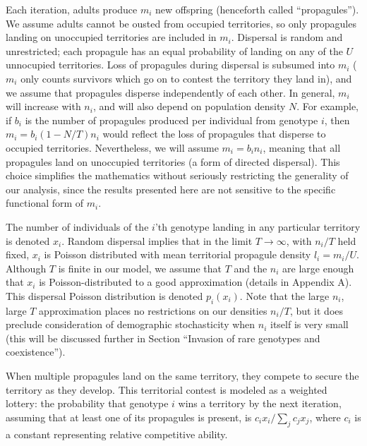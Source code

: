 \documentclass[11pt]{article}
\begin{document}
Each iteration, adults produce $m_i$ new offspring (henceforth called ``propagules''). We assume adults cannot be ousted from occupied territories, so only propagules landing on unoccupied territories are included in $m_i$. Dispersal is random and unrestricted; each propagule has an equal probability of landing on any of the $U$ unnocupied territories. Loss of propagules during dispersal is subsumed into $m_i$ ($m_i$ only counts survivors which go on to contest the territory they land in), and we assume that propagules disperse independently of each other. In general, $m_i$ will increase with $n_i$, and will also depend on population density $N$. For example, if $b_i$ is the number of propagules produced per individual from genotype $i$, then $m_i=b_i(1-N/T)n_i$ would reflect the loss of propagules that disperse to occupied territories. Nevertheless, we will assume $m_i=b_i n_i$, meaning that all propagules land on unoccupied territories (a form of directed dispersal). This choice simplifies the mathematics without seriously restricting the generality of our analysis, since the results presented here are not sensitive to the specific functional form of $m_i$. 

The number of individuals of the $i$'th genotype landing in any particular territory is denoted $x_i$. Random dispersal implies that in the limit $T\rightarrow \infty$, with $n_i/T$ held fixed, $x_i$ is Poisson distributed with mean territorial propagule density $l_i=m_i/U$. Although $T$ is finite in our model, we assume that $T$ and the $n_i$ are large enough that $x_i$ is Poisson-distributed to a good approximation (details in Appendix A). This dispersal Poisson distribution is denoted $p_i(x_i)$. Note that the large $n_i$, large $T$ approximation places no restrictions on our densities $n_i/T$, but it does preclude consideration of demographic stochasticity when $n_i$ itself is very small (this will be discussed further in Section ``Invasion of rare genotypes and coexistence'').

When multiple propagules land on the same territory, they compete to secure the territory as they develop. This territorial contest is modeled as a weighted lottery: the probability that genotype $i$ wins a territory by the next iteration, assuming that at least one of its propagules is present, is $c_i x_i/\sum_j c_j x_j$, where $c_i$ is a constant representing relative competitive ability. 
\end{document}
